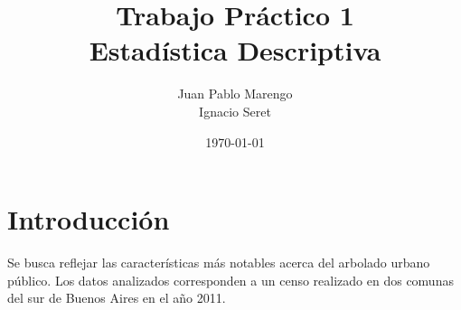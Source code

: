 \documentclass{article}
\title{Trabajo Práctico 1 \\ Estadística Descriptiva}
\author{Juan Pablo Marengo \\ Ignacio Seret}
\date{\today}
\begin{document}
\maketitle

\thispagestyle{empty}

\newpage

\tableofcontents

\newpage

\section{Introducción}

Se busca reflejar las características más notables acerca del arbolado urbano público. Los datos analizados corresponden a un censo realizado en dos comunas del sur de Buenos Aires en el año 2011.
\end{document}
